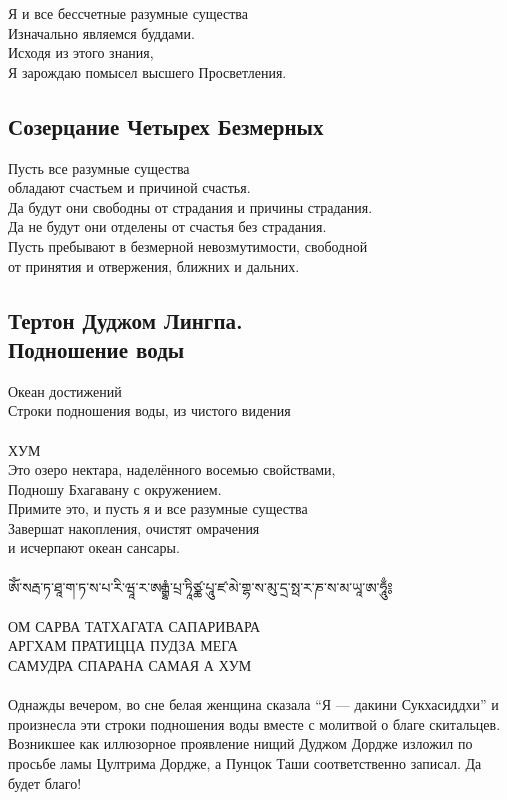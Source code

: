 Я и все бессчетные разумные существа\\
Изначально являемся буддами.\\
Исходя из этого знания,\\
Я зарождаю помысел высшего Просветления.\\
\normalsize
\subsection{Созерцание Четырех Безмерных}

Пусть все разумные существа \\ \indent обладают счастьем и причиной счастья.\\
Да будут они свободны от страдания и причины страдания.\\
Да не будут они отделены от счастья без страдания.\\
Пусть пребывают в безмерной невозмутимости, свободной \\
\indent от принятия и отвержения, ближних и дальних.

\newpage %
\subsection{Тертон Дуджом Лингпа.\\Подношение воды}

\large Океан достижений \\
\normalsize Строки подношения воды, из чистого видения\\
\\
ХУМ\\
Это озеро нектара, наделённого восемью свойствами,\\
Подношу Бхагавану с окружением.\\
Примите это, и пусть я и все разумные существа\\
Завершат накопления, очистят омрачения \\ \indent и исчерпают океан сансары.\\
\\
\ti
ཨོཾ་སརྦ་ཏ་ཐཱ་ག་ཏ་ས་པ་རི་ཝཱ་ར་ཨརྒྷཾ་པྲ་ཏཱིཙྪ་པཱུ་ཛ་མེ་གྷ་ས་མུ་དྲ་སྥ་ར་ཎ་ས་མ་ཡཱ་ཨ་ཧཱུྃ༔\\
\\
\ru
ОМ САРВА ТАТХАГАТА САПАРИВАРА\\
АРГХАМ ПРАТИЦЦА ПУДЗА МЕГА \\
САМУДРА СПАРАНА САМАЯ А ХУМ\\
\\
\scriptsize
Однажды вечером, во сне белая женщина сказала “Я — дакини Сукхасиддхи”
и произнесла эти строки подношения воды вместе с молитвой о благе скитальцев.
Возникшее как иллюзорное проявление нищий Дуджом Дордже изложил
по просьбе ламы Цултрима Дордже, а Пунцок Таши соответственно записал.
Да будет благо!\normalsize

